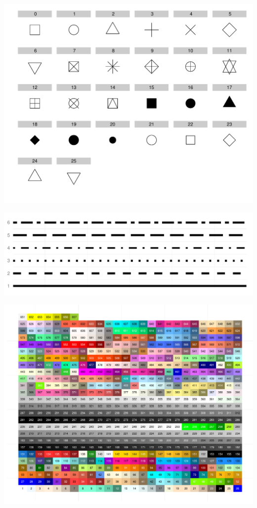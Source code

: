 \documentclass[letterpaper]{article}
\begin{document}


\begin{center}


\includegraphics{ggplotCheatSheet-002}

\includegraphics{linetypes}


\includegraphics{ggplotCheatSheet-004}


\end{center}
\end{document}
